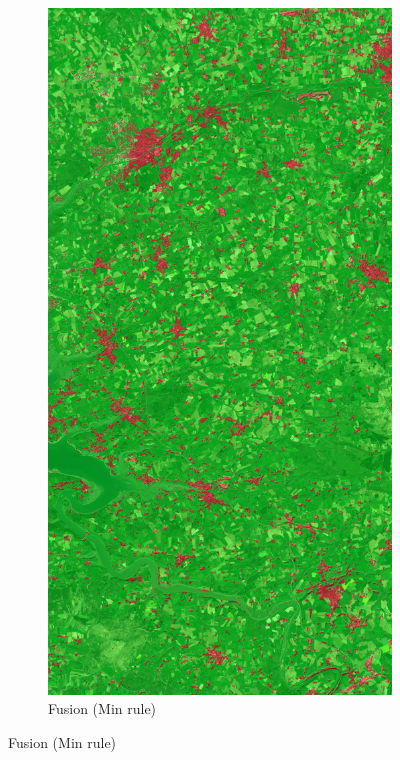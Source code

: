 \documentclass[10pt]{article}
\begin{document}
\begin{figure}[H]
    \centering 
    \begin{subfigure}{0.49\textwidth}
        \centering
        \includegraphics[width=\textwidth]{all_classif_Fusion_Min_overlay}
        \caption{Fusion (Min rule)}

\end{subfigure}
\end{figure}
\end{document}
